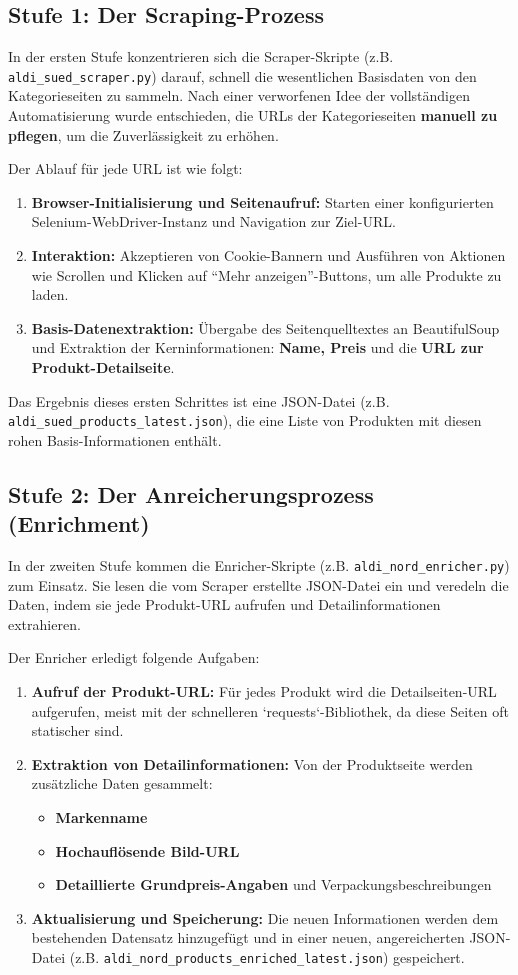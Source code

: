 \documentclass[12pt, a4paper]{report} %
\begin{document}
\subsection{Stufe 1: Der Scraping-Prozess}
In der ersten Stufe konzentrieren sich die Scraper-Skripte (z.B. \texttt{aldi\_sued\_scraper.py}) darauf, schnell die wesentlichen Basisdaten von den Kategorieseiten zu sammeln. Nach einer verworfenen Idee der vollständigen Automatisierung wurde entschieden, die URLs der Kategorieseiten \textbf{manuell zu pflegen}, um die Zuverlässigkeit zu erhöhen.

Der Ablauf für jede URL ist wie folgt:
\begin{enumerate}
    \item \textbf{Browser-Initialisierung und Seitenaufruf:} Starten einer konfigurierten Selenium-WebDriver-Instanz und Navigation zur Ziel-URL.
    \item \textbf{Interaktion:} Akzeptieren von Cookie-Bannern und Ausführen von Aktionen wie Scrollen und Klicken auf "`Mehr anzeigen"'-Buttons, um alle Produkte zu laden.
    \item \textbf{Basis-Datenextraktion:} Übergabe des Seitenquelltextes an BeautifulSoup und Extraktion der Kerninformationen: \textbf{Name, Preis} und die \textbf{URL zur Produkt-Detailseite}.
\end{enumerate}
Das Ergebnis dieses ersten Schrittes ist eine JSON-Datei (z.B. \texttt{aldi\_sued\_products\_latest.json}), die eine Liste von Produkten mit diesen rohen Basis-Informationen enthält.

\subsection{Stufe 2: Der Anreicherungsprozess (Enrichment)}
In der zweiten Stufe kommen die Enricher-Skripte (z.B. \texttt{aldi\_nord\_enricher.py}) zum Einsatz. Sie lesen die vom Scraper erstellte JSON-Datei ein und veredeln die Daten, indem sie jede Produkt-URL aufrufen und Detailinformationen extrahieren.

Der Enricher erledigt folgende Aufgaben:
\begin{enumerate}
    \item \textbf{Aufruf der Produkt-URL:} Für jedes Produkt wird die Detailseiten-URL aufgerufen, meist mit der schnelleren `requests`-Bibliothek, da diese Seiten oft statischer sind.
    \item \textbf{Extraktion von Detailinformationen:} Von der Produktseite werden zusätzliche Daten gesammelt:
        \begin{itemize}
            \item \textbf{Markenname}
            \item \textbf{Hochauflösende Bild-URL}
            \item \textbf{Detaillierte Grundpreis-Angaben} und Verpackungsbeschreibungen
        \end{itemize}
    \item \textbf{Aktualisierung und Speicherung:} Die neuen Informationen werden dem bestehenden Datensatz hinzugefügt und in einer neuen, angereicherten JSON-Datei (z.B. \texttt{aldi\_nord\_products\_enriched\_latest.json}) gespeichert.
\end{enumerate}
\end{document}

